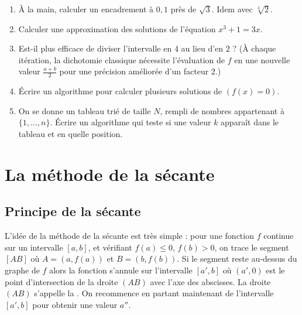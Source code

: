 \documentclass[class=report,crop=false]{standalone}
\begin{document}
\begin{miniexercices}
\begin{enumerate}
  \item \`A la main, calculer un encadrement à $0,1$ près de $\sqrt{3}$.
  Idem avec $\sqrt[3]{2}$.

  \item Calculer une approximation des solutions de l'équation $x^3+1=3x$.

  \item Est-il plus efficace de diviser l'intervalle en $4$ au lieu d'en $2$ ?
  (\`A chaque itération, la dichotomie classique nécessite l'évaluation de $f$ en une nouvelle valeur
  $\frac{a+b}{2}$ pour une précision améliorée d'un facteur $2$.)

  \item \'Ecrire un algorithme pour calculer plusieurs solutions de $(f(x)=0)$.

  \item On se donne un tableau trié de taille $N$, rempli de nombres appartenant à $\{1,\ldots,n\}$.
  \'Ecrire un algorithme qui teste si une valeur $k$ apparaît dans le tableau et en quelle position.

\end{enumerate}
\end{miniexercices}


\section{La méthode de la sécante}

\subsection{Principe de la sécante}

L'idée de la méthode de la sécante est très simple : pour une fonction $f$ continue sur un intervalle $[a,b]$, et vérifiant $f(a) \le 0$, $f(b) > 0$, on trace le segment $[AB]$ où $A=(a,f(a))$ et $B=(b,f(b))$. Si le segment reste au-dessus du graphe de $f$ alors la fonction s'annule sur l'intervalle $[a',b]$ où $(a',0)$ est le point d'intersection de
la droite $(AB)$ avec l'axe des abscisses. La droite $(AB)$ s'appelle la .
On recommence en partant maintenant de l'intervalle $[a',b]$ pour obtenir une valeur $a''$.


\end{document}
